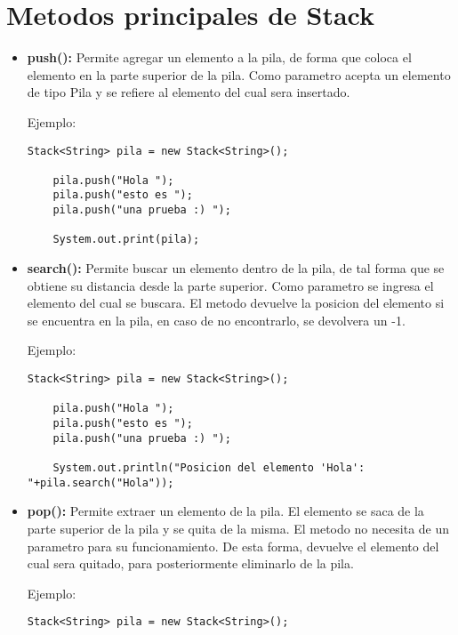 \documentclass[12pt, letterpaper]{article} %
\begin{document}
\section*{Metodos principales de Stack}
\begin{itemize}
    \item \textbf{push():} Permite agregar un elemento a la pila, de forma que coloca el elemento en la parte superior de la pila. Como parametro acepta un elemento de tipo Pila y se refiere al elemento del cual sera insertado.

    Ejemplo:
    \lstset{language = Java, breaklines=true, basicstyle=\footnotesize}
    \begin{lstlisting}[frame=single]
    Stack<String> pila = new Stack<String>();

    pila.push("Hola ");
    pila.push("esto es ");
    pila.push("una prueba :) ");

    System.out.print(pila);
    \end{lstlisting}

    \item \textbf{search():} Permite buscar un elemento dentro de la pila, de tal forma que se obtiene su distancia desde la parte superior. Como parametro se ingresa el elemento del cual se buscara. El metodo devuelve la posicion del elemento si se encuentra en la pila, en caso de no encontrarlo, se devolvera un -1.

    Ejemplo:
    \lstset{language = Java, breaklines=true, basicstyle=\footnotesize}
    \begin{lstlisting}[frame=single]
    Stack<String> pila = new Stack<String>();

    pila.push("Hola ");
    pila.push("esto es ");
    pila.push("una prueba :) ");

    System.out.println("Posicion del elemento 'Hola':  "+pila.search("Hola"));
    \end{lstlisting}

    \item \textbf{pop():} Permite extraer un elemento de la pila. El elemento se saca de la parte superior de la pila y se quita de la misma. El metodo no necesita de un parametro para su funcionamiento. De esta forma, devuelve el elemento del cual sera quitado, para posteriormente eliminarlo de la pila.
    
    Ejemplo:
    \lstset{language = Java, breaklines=true, basicstyle=\footnotesize}
    \begin{lstlisting}[frame=single]
    Stack<String> pila = new Stack<String>();


\end{lstlisting}
\end{itemize}
\end{document}
